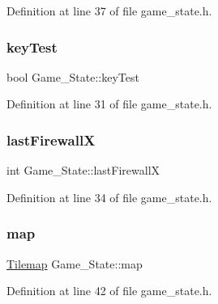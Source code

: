 Definition at line 37 of file game\+\_\+state.\+h.

\hypertarget{class_game___state_a173b2606fcaf010b8f1eb8b6e5487a4e}{}\label{class_game___state_a173b2606fcaf010b8f1eb8b6e5487a4e} 
\subsubsection{\texorpdfstring{key\+Test}{keyTest}}
{\footnotesize\ttfamily bool Game\+\_\+\+State\+::key\+Test\hspace{0.3cm}{\ttfamily [protected]}}



Definition at line 31 of file game\+\_\+state.\+h.

\hypertarget{class_game___state_ab7f247337f6c29608333e2c8fe79b973}{}\label{class_game___state_ab7f247337f6c29608333e2c8fe79b973} 
\subsubsection{\texorpdfstring{last\+FirewallX}{lastFirewallX}}
{\footnotesize\ttfamily int Game\+\_\+\+State\+::last\+FirewallX\hspace{0.3cm}{\ttfamily [protected]}}



Definition at line 34 of file game\+\_\+state.\+h.

\hypertarget{class_game___state_af09e995b6bf08cbc23ef6dc4b32ad5cd}{}\label{class_game___state_af09e995b6bf08cbc23ef6dc4b32ad5cd} 
\subsubsection{\texorpdfstring{map}{map}}
{\footnotesize\ttfamily \hyperlink{class_tilemap}{Tilemap} Game\+\_\+\+State\+::map\hspace{0.3cm}{\ttfamily [protected]}}



Definition at line 42 of file game\+\_\+state.\+h.

\hypertarget{class_game___state_a9de848045ff6eb1a2a2548a82fcd87b5}{}\label{class_game___state_a9de848045ff6eb1a2a2548a82fcd87b5} 
